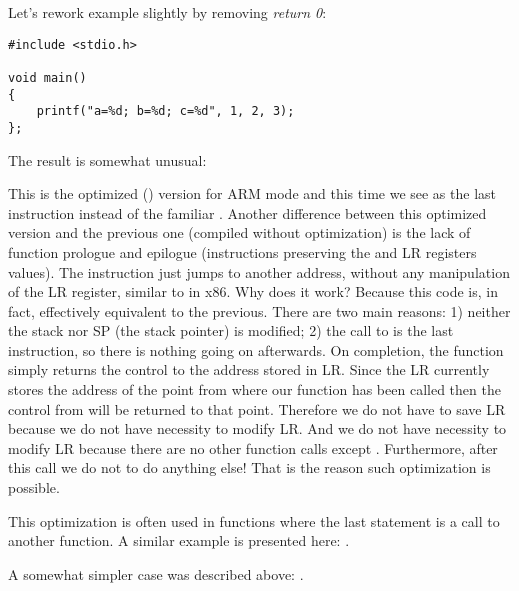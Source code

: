 \label{ARM_B_to_printf}

Let's rework example slightly by removing \emph{return 0}:

\begin{lstlisting}[style=customc]
#include <stdio.h>

void main()
{
	printf("a=%d; b=%d; c=%d", 1, 2, 3);
};
\end{lstlisting}

The result is somewhat unusual:



This is the optimized (\Othree) version for ARM mode and this time we see  as the last instruction instead of the familiar .
Another difference between this optimized version and the previous one (compiled without optimization)
is the lack of function prologue and epilogue (instructions preserving the  and \ac{LR} registers values).
The  instruction just jumps to another address, without any manipulation of the \ac{LR} register,
similar to \JMP in x86.
Why does it work? Because this code is, in fact, effectively equivalent to the previous.
There are two main reasons: 1) neither the stack nor \ac{SP} (the \gls{stack pointer}) is modified;
2) the call to \printf is the last instruction, so there is nothing going on afterwards.
On completion, the \printf function simply returns the control to the address 
stored in \ac{LR}.
Since the \ac{LR} currently stores the address of the point from where our function
has been called then the control from \printf will be returned to that point.
Therefore we do not have to save \ac{LR} because we do not have necessity to modify \ac{LR}.
And we do not have necessity to modify \ac{LR} because there are no other function calls except \printf. Furthermore,
after this call we do not to do anything else!
That is the reason such optimization is possible.

This optimization is often used in functions where the last statement is a call to another function.
A similar example is presented here:
.

A somewhat simpler case was described above: .


